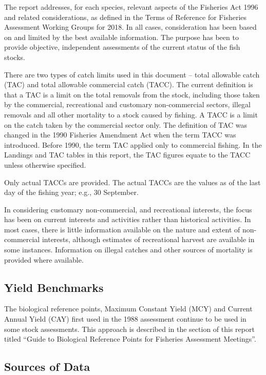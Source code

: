 \documentclass{mpi-plenary}
\theoremstyle{definition}
\theoremstyle{definition}
\theoremstyle{definition}
\theoremstyle{remark}
\begin{document}
The report addresses, for each species, relevant aspects of the
Fisheries Act 1996 and related considerations, as defined in the Terms
of Reference for Fisheries Assessment Working Groups for 2018. In all
cases, consideration has been based on and limited by the best available
information. The purpose has been to provide objective, independent
assessments of the current status of the fish stocks.

There are two types of catch limits used in this document -- total
allowable catch (TAC) and total allowable commercial catch (TACC). The
current definition is that a TAC is a limit on the total removals from
the stock, including those taken by the commercial, recreational and
customary non-commercial sectors, illegal removals and all other
mortality to a stock caused by fishing. A TACC is a limit on the catch
taken by the commercial sector only. The definition of TAC was changed
in the 1990 Fisheries Amendment Act when the term TACC was introduced.
Before 1990, the term TAC applied only to commercial fishing. In the
Landings and TAC tables in this report, the TAC figures equate to the
TACC unless otherwise specified.

Only actual TACCs are provided. The actual TACCs are the values as of
the last day of the fishing year; e.g., 30 September.

In considering customary non-commercial, and recreational interests, the
focus has been on current interests and activities rather than
historical activities. In most cases, there is little information
available on the nature and extent of non-commercial interests, although
estimates of recreational harvest are available in some instances.
Information on illegal catches and other sources of mortality is
provided where available.

\subsection{Yield Benchmarks}\label{yield-benchmarks}

The biological reference points, Maximum Constant Yield (MCY) and
Current Annual Yield (CAY) first used in the 1988 assessment continue to
be used in some stock assessments. This approach is described in the
section of this report titled ``Guide to Biological Reference Points for
Fisheries Assessment Meetings''.

\subsection{Sources of Data}\label{sources-of-data}
\end{document}
